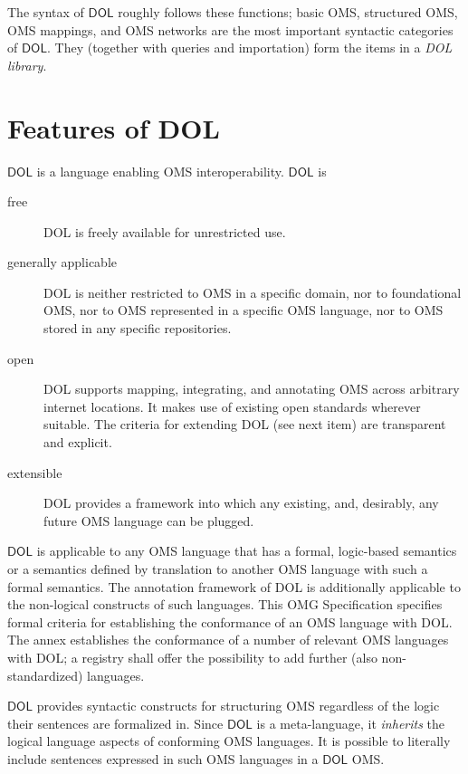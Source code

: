 \documentclass[10pt,fleqn,%
\ifpretendfinal
final%
\else
draft%
\fi,
]{scrreprt}
\newcommand*{\IS}{OMG Specification\xspace}
\newcommand*{\DOL}{\ensuremath{\mathsf{DOL}}\xspace}
\begin{document}
The syntax of \DOL roughly follows these functions; basic OMS, structured OMS, OMS
mappings, and OMS networks are the most important syntactic categories of \DOL. 
They (together with queries and importation) form the items in a \emph{DOL library}.
 





\section{Features of DOL}\label{c:req:overview}

\DOL is a language enabling OMS interoperability. 
\DOL is
\begin{description}
\item[free] DOL is freely available for unrestricted use.
\item[generally applicable] DOL is neither restricted to OMS in a specific domain, nor to foundational OMS, nor to OMS represented in a specific OMS language, nor to OMS stored in any specific repositories.
\item[open] DOL supports mapping, integrating, and annotating OMS across arbitrary internet locations.  It makes use of existing open standards wherever suitable.  The criteria for extending DOL (see next item) are transparent and explicit.
\item[extensible] DOL provides a framework into which any existing, and, desirably, any future OMS language can be plugged.
\end{description}
\DOL is applicable to any OMS language that has a formal, logic-based semantics or a semantics defined by translation to another OMS language with such a formal semantics. The annotation framework of DOL is additionally applicable to the non-logical constructs of such languages. This \IS specifies formal criteria for establishing the conformance of an OMS language with DOL.  The annex establishes the conformance of a number of relevant OMS languages with DOL; a registry shall offer the possibility to add further (also non-standardized) languages. 

\DOL provides syntactic constructs for structuring OMS regardless of the logic their sentences are formalized in. 
Since \DOL is a meta-language,  it \textit{inherits} the logical language aspects of conforming OMS languages.  It is possible to literally include sentences expressed in such OMS languages in a \DOL OMS.
\end{document}
